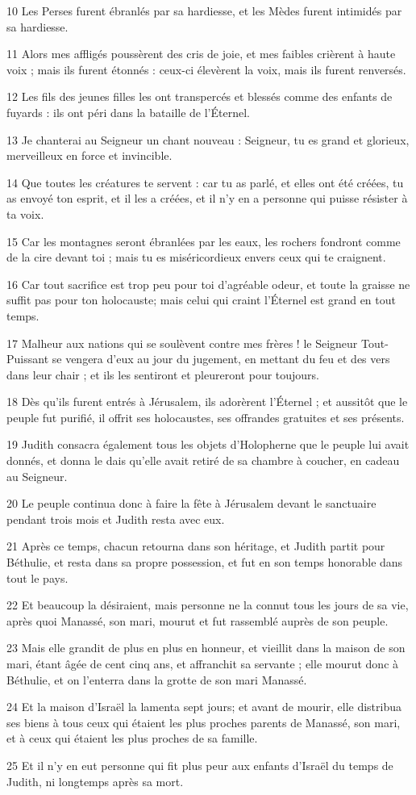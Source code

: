 \par 10 Les Perses furent ébranlés par sa hardiesse, et les Mèdes furent intimidés par sa hardiesse.
\par 11 Alors mes affligés poussèrent des cris de joie, et mes faibles crièrent à haute voix ; mais ils furent étonnés : ceux-ci élevèrent la voix, mais ils furent renversés.
\par 12 Les fils des jeunes filles les ont transpercés et blessés comme des enfants de fuyards : ils ont péri dans la bataille de l'Éternel.
\par 13 Je chanterai au Seigneur un chant nouveau : Seigneur, tu es grand et glorieux, merveilleux en force et invincible.
\par 14 Que toutes les créatures te servent : car tu as parlé, et elles ont été créées, tu as envoyé ton esprit, et il les a créées, et il n'y en a personne qui puisse résister à ta voix.
\par 15 Car les montagnes seront ébranlées par les eaux, les rochers fondront comme de la cire devant toi ; mais tu es miséricordieux envers ceux qui te craignent.
\par 16 Car tout sacrifice est trop peu pour toi d'agréable odeur, et toute la graisse ne suffit pas pour ton holocauste; mais celui qui craint l'Éternel est grand en tout temps.
\par 17 Malheur aux nations qui se soulèvent contre mes frères ! le Seigneur Tout-Puissant se vengera d'eux au jour du jugement, en mettant du feu et des vers dans leur chair ; et ils les sentiront et pleureront pour toujours.
\par 18 Dès qu'ils furent entrés à Jérusalem, ils adorèrent l'Éternel ; et aussitôt que le peuple fut purifié, il offrit ses holocaustes, ses offrandes gratuites et ses présents.
\par 19 Judith consacra également tous les objets d'Holopherne que le peuple lui avait donnés, et donna le dais qu'elle avait retiré de sa chambre à coucher, en cadeau au Seigneur.
\par 20 Le peuple continua donc à faire la fête à Jérusalem devant le sanctuaire pendant trois mois et Judith resta avec eux.
\par 21 Après ce temps, chacun retourna dans son héritage, et Judith partit pour Béthulie, et resta dans sa propre possession, et fut en son temps honorable dans tout le pays.
\par 22 Et beaucoup la désiraient, mais personne ne la connut tous les jours de sa vie, après quoi Manassé, son mari, mourut et fut rassemblé auprès de son peuple.
\par 23 Mais elle grandit de plus en plus en honneur, et vieillit dans la maison de son mari, étant âgée de cent cinq ans, et affranchit sa servante ; elle mourut donc à Béthulie, et on l'enterra dans la grotte de son mari Manassé.
\par 24 Et la maison d'Israël la lamenta sept jours; et avant de mourir, elle distribua ses biens à tous ceux qui étaient les plus proches parents de Manassé, son mari, et à ceux qui étaient les plus proches de sa famille.
\par 25 Et il n'y en eut personne qui fit plus peur aux enfants d'Israël du temps de Judith, ni longtemps après sa mort.


